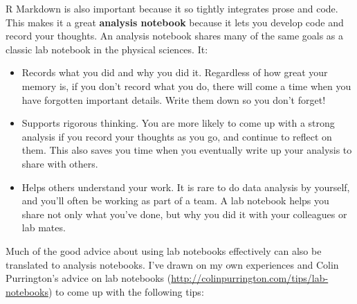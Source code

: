\documentclass[]{book}
\begin{document}
R Markdown is also important because it so tightly integrates prose and
code. This makes it a great \textbf{analysis notebook} because it lets
you develop code and record your thoughts. An analysis notebook shares
many of the same goals as a classic lab notebook in the physical
sciences. It:

\begin{itemize}
\item
  Records what you did and why you did it. Regardless of how great your
  memory is, if you don't record what you do, there will come a time
  when you have forgotten important details. Write them down so you
  don't forget!
\item
  Supports rigorous thinking. You are more likely to come up with a
  strong analysis if you record your thoughts as you go, and continue to
  reflect on them. This also saves you time when you eventually write up
  your analysis to share with others.
\item
  Helps others understand your work. It is rare to do data analysis by
  yourself, and you'll often be working as part of a team. A lab
  notebook helps you share not only what you've done, but why you did it
  with your colleagues or lab mates.
\end{itemize}

Much of the good advice about using lab notebooks effectively can also
be translated to analysis notebooks. I've drawn on my own experiences
and Colin Purrington's advice on lab notebooks
(\url{http://colinpurrington.com/tips/lab-notebooks}) to come up with
the following tips:
\end{document}
